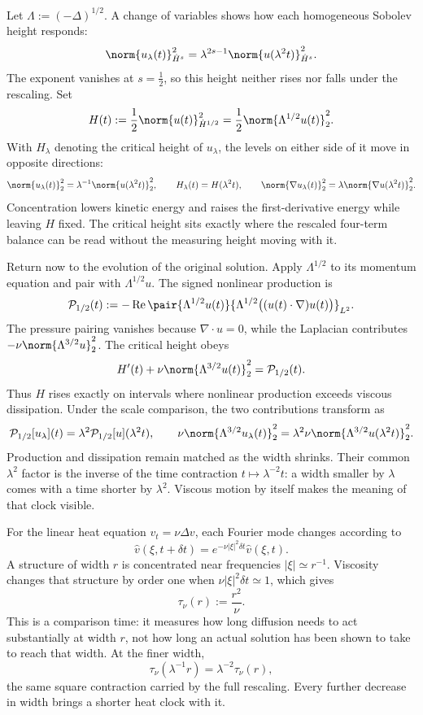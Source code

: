 Let \(\Lambda:=(-\Delta)^{1/2}\).
A change of variables shows how each homogeneous Sobolev height responds:
\[
  \norm{u_\lambda(t)}_{\dot H^s}^2
  =
  \lambda^{2s-1}
  \norm{u(\lambda^2t)}_{\dot H^s}^2.
\]
The exponent vanishes at \(s=\tfrac12\), so this height neither rises nor falls under the rescaling.
Set
\[
  H(t)
  :=
  \frac12\norm{u(t)}_{\dot H^{1/2}}^2
  =
  \frac12\norm{\Lambda^{1/2}u(t)}_2^2.
\]
With \(H_\lambda\) denoting the critical height of \(u_\lambda\), the levels on either side of it move in opposite directions:
\[
  \norm{u_\lambda(t)}_2^2
  =
  \lambda^{-1}\norm{u(\lambda^2t)}_2^2,
  \qquad
  H_\lambda(t)=H(\lambda^2t),
  \qquad
  \norm{\nabla u_\lambda(t)}_2^2
  =
  \lambda\norm{\nabla u(\lambda^2t)}_2^2.
\]
Concentration lowers kinetic energy and raises the first-derivative energy while leaving \(H\) fixed.
The critical height sits exactly where the rescaled four-term balance can be read without the measuring height moving with it.


Return now to the evolution of the original solution.
Apply \(\Lambda^{1/2}\) to its momentum equation and pair with \(\Lambda^{1/2}u\).
The signed nonlinear production is
\[
  \mathcal P_{1/2}(t)
  :=
  -\operatorname{Re}
  \pair
    {\Lambda^{1/2}u(t)}
    {\Lambda^{1/2}\bigl((u(t)\cdot\nabla)u(t)\bigr)}_{L^2}.
\]
The pressure pairing vanishes because \(\nabla\cdot u=0\), while the Laplacian contributes \(-\nu\norm{\Lambda^{3/2}u}_2^2\).
The critical height obeys
\[
  H'(t)
  +
  \nu\norm{\Lambda^{3/2}u(t)}_2^2
  =
  \mathcal P_{1/2}(t).
\]
Thus \(H\) rises exactly on intervals where nonlinear production exceeds viscous dissipation.
Under the scale comparison, the two contributions transform as
\[
  \mathcal P_{1/2}[u_\lambda](t)
  =
  \lambda^2\mathcal P_{1/2}[u](\lambda^2t),
  \qquad
  \nu\norm{\Lambda^{3/2}u_\lambda(t)}_2^2
  =
  \lambda^2\nu\norm{\Lambda^{3/2}u(\lambda^2t)}_2^2.
\]
Production and dissipation remain matched as the width shrinks.
Their common \(\lambda^2\) factor is the inverse of the time contraction \(t\mapsto\lambda^{-2}t\): a width smaller by \(\lambda\) comes with a time shorter by \(\lambda^2\).
Viscous motion by itself makes the meaning of that clock visible.


For the linear heat equation \(v_t=\nu\Delta v\), each Fourier mode changes according to
\[
  \widehat v(\xi,t+\delta t)
  =
  e^{-\nu|\xi|^2\delta t}\widehat v(\xi,t).
\]
A structure of width \(r\) is concentrated near frequencies \(|\xi|\simeq r^{-1}\).
Viscosity changes that structure by order one when \(\nu|\xi|^2\delta t\simeq1\), which gives
\[
  \tau_\nu(r)
  :=
  \frac{r^2}{\nu}.
\]
This is a comparison time: it measures how long diffusion needs to act substantially at width \(r\), not how long an actual \NavierStokes{} solution has been shown to take to reach that width.
At the finer width,
\[
  \tau_\nu(\lambda^{-1}r)
  =
  \lambda^{-2}\tau_\nu(r),
\]
the same square contraction carried by the full \NavierStokes{} rescaling.
Every further decrease in width brings a shorter heat clock with it.

